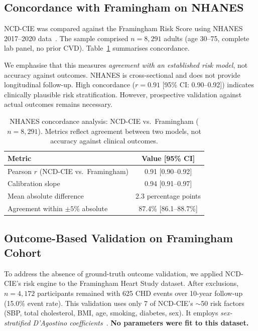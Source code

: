 \documentclass[runningheads]{llncs}
\begin{document}
\subsection{Concordance with Framingham on NHANES}\label{sec:nhanes}

NCD-CIE was compared against the Framingham Risk Score using NHANES
2017--2020 data~\cite{nhanes2020}.
The sample comprised $n = 8{,}291$ adults (age 30--75, complete lab
panel, no prior CVD).
Table~\ref{tab:nhanes} summarises concordance.

We emphasise that this measures \emph{agreement with an established
risk model}, not accuracy against outcomes.
NHANES is cross-sectional and does not provide longitudinal follow-up.
High concordance ($r = 0.91$ [95\% CI: 0.90--0.92]) indicates
clinically plausible risk stratification.
However, prospective validation against actual outcomes remains
necessary.

\renewcommand{\arraystretch}{1.2}
\begin{table}[t]
\centering
\caption{NHANES concordance analysis: NCD-CIE vs.\ Framingham
($n = 8{,}291$).  Metrics reflect agreement between two models,
not accuracy against clinical outcomes.}
\label{tab:nhanes}
\small
\begin{tabular}{@{}lc@{}}
\toprule
\textbf{Metric} & \textbf{Value [95\% CI]} \\
\midrule
Pearson $r$ (NCD-CIE vs.\ Framingham) & 0.91 [0.90--0.92] \\
Calibration slope                       & 0.94 [0.91--0.97] \\
Mean absolute difference                & 2.3 percentage points \\
Agreement within $\pm 5$\% absolute     & 87.4\% [86.1--88.7\%] \\
\bottomrule
\end{tabular}
\end{table}
\renewcommand{\arraystretch}{1.0}

\subsection{Outcome-Based Validation on Framingham Cohort}\label{sec:framingham}

To address the absence of ground-truth outcome validation, we applied
NCD-CIE's risk engine to the Framingham Heart Study dataset.
After exclusions, $n = 4{,}172$ participants remained with 625 CHD
events over 10-year follow-up (15.0\% event rate).
This validation uses only 7 of NCD-CIE's ${\sim}$50 risk factors
(SBP, total cholesterol, BMI, age, smoking, diabetes, sex).
It employs \emph{sex-stratified D'Agostino
coefficients}~\cite{dagostino2008}.
\textbf{No parameters were fit to this dataset.}
\end{document}
